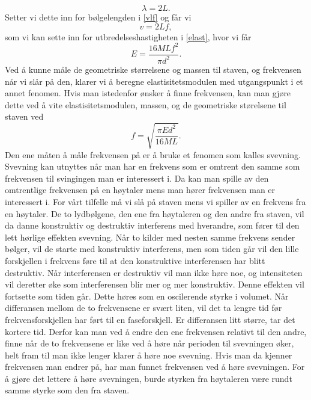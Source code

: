 \documentclass[%
 reprint,
 amsmath,amssymb,
 aps,
 norsk,
 booktabs
]{revtex4-1}
\begin{document}
\begin{equation}
  \lambda = 2L.
\end{equation}
Setter vi dette inn for bølgelengden i \eqref{vlf} og får vi
\begin{equation*}
  v = 2Lf,
\end{equation*}
som vi kan sette inn for utbredelseshastigheten i \eqref{elast}, hvor vi får
\begin{equation}
  E = \frac{16MLf^2}{\pi d^2}. \label{young5}
\end{equation}
Ved å kunne måle de geometriske størrelsene og massen til staven, og frekvensen når vi slår på den, klarer vi å beregne elastisitetsmodulen med utgangspunkt i et annet fenomen. Hvis man istedenfor ønsker å finne frekvensen, kan man gjøre dette ved å vite elastisitetsmodulen, massen, og de geometriske størelsene til staven ved
\begin{equation}
  f = \sqrt{\frac{\pi E d^2}{16ML}}. \label{young6}
\end{equation}
Den ene måten å måle frekvensen på er å bruke et fenomen som kalles svevning. Svevning kan utnyttes når man har en frekvens som er omtrent den samme som frekvensen til svingingen man er interessert i. Da kan man spille av den omtrentlige frekvensen på en høytaler mens man hører frekvensen man er interessert i. For vårt tilfelle må vi slå på staven mens vi spiller av en frekvens fra en høytaler. De to lydbølgene, den ene fra høytaleren og den andre fra staven, vil da danne konstruktiv og destruktiv interferens med hverandre, som fører til den lett hørlige effekten svevning. Når to kilder med nesten samme frekvens sender bølger, vil de starte med konstruktiv interferens, men som tiden går vil den lille forskjellen i frekvens føre til at den konstruktive interferensen har blitt destruktiv. Når interferensen er destruktiv vil man ikke høre noe, og intensiteten vil deretter øke som interferensen blir mer og mer konstruktiv. Denne effekten vil fortsette som tiden går. Dette høres som en oscilerende styrke i volumet. Når differansen mellom de to frekvensene er svært liten, vil det ta lengre tid før frekvensforskjellen har ført til en faseforskjell. Er differansen litt større, tar det kortere tid. Derfor kan man ved å endre den ene frekvensen relativt til den andre, finne når de to frekvensene er like ved å høre når perioden til svevningen øker, helt fram til man ikke lenger klarer å høre noe svevning. Hvis man da kjenner frekvensen man endrer på, har man funnet frekvensen ved å høre svevningen. For å gjøre det lettere å høre svevningen, burde styrken fra høytaleren være rundt samme styrke som den fra staven.
\end{document}

